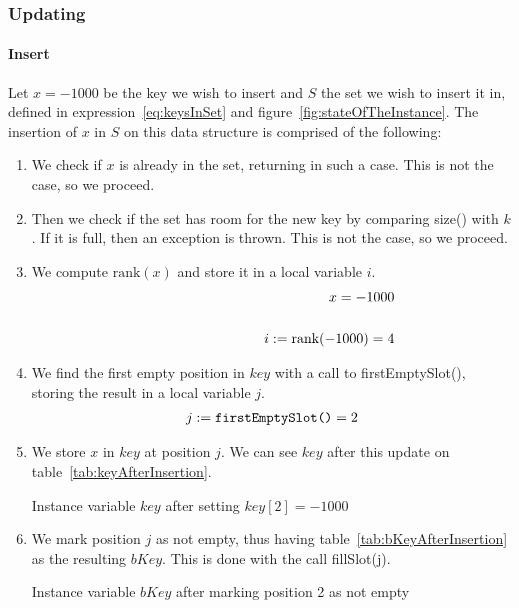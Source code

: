 \subsubsection{Updating}

\paragraph{Insert} \label{sec:binaryRankInsertExample}

Let $x = -1000$ be the key we wish to insert and $S$ the set we wish to insert it in, defined in expression~\ref{eq:keysInSet} and figure~\ref{fig:stateOfTheInstance}. The insertion of $x$ in $S$ on this data structure is comprised of the following:
\begin{enumerate}
    \item
    We check if $x$ is already in the set, returning in such a case.
    This is not the case, so we proceed.
    
    \item
    Then we check if the set has room for the new key by comparing {\ttfamily size()} with $k$. If it is full, then an exception is thrown.
    This is not the case, so we proceed.
    
    \item
    We compute $\text{rank}(x)$ and store it in a local variable $i$.
    \begin{align*}
        x = -1000 \\
        \cline{1-2}
        i := \text{rank}(-1000) = 4
    \end{align*}
    
    \item
    We find the first empty position in $key$ with a call to {\ttfamily firstEmptySlot()}, storing the result in a local variable $j$.
    \begin{align*}
        j := \text{{\ttfamily firstEmptySlot()}} = 2
    \end{align*}
    
    \item
    We store $x$ in $key$ at position $j$. We can see $key$ after this update on table~\ref{tab:keyAfterInsertion}.
    \begin{table}[H]
    \centering
    
    \caption{Instance variable $key$ after setting $key[2] = -1000$}
    \label{tab:keyAfterInsertion}
    \end{table}
    
    \item
    We mark position $j$ as not empty, thus having table~\ref{tab:bKeyAfterInsertion} as the resulting $bKey$. This is done with the call {\ttfamily fillSlot(j)}.
    \begin{table}[H]
    \centering
    
    \caption{Instance variable $bKey$ after marking position 2 as not empty}
    \label{tab:bKeyAfterInsertion}
    \end{table}
    

\end{enumerate}
